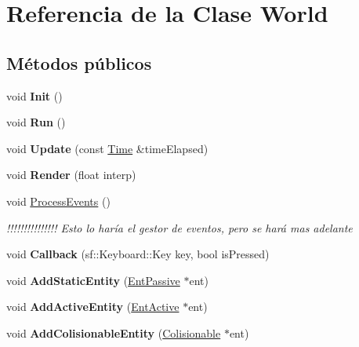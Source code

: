 \hypertarget{classWorld}{\section{Referencia de la Clase World}
\label{classWorld}
}
\subsection*{Métodos públicos}
\begin{DoxyCompactItemize}
\item 
\hypertarget{classWorld_a8f79652f07f99fa41b3db357c4efb895}{void {\bfseries Init} ()}\label{classWorld_a8f79652f07f99fa41b3db357c4efb895}

\item 
\hypertarget{classWorld_acea6eb85cbad062ded1e62193496e9f5}{void {\bfseries Run} ()}\label{classWorld_acea6eb85cbad062ded1e62193496e9f5}

\item 
\hypertarget{classWorld_add9920638985c1c96f2c4616db993ec8}{void {\bfseries Update} (const \hyperlink{classTime}{Time} \&time\-Elapsed)}\label{classWorld_add9920638985c1c96f2c4616db993ec8}

\item 
\hypertarget{classWorld_a4623e37c9b4df02ab156cb185d239df8}{void {\bfseries Render} (float interp)}\label{classWorld_a4623e37c9b4df02ab156cb185d239df8}

\item 
\hypertarget{classWorld_a9b75a4c608052f44f6a712e3d4533169}{void \hyperlink{classWorld_a9b75a4c608052f44f6a712e3d4533169}{Process\-Events} ()}\label{classWorld_a9b75a4c608052f44f6a712e3d4533169}

\begin{DoxyCompactList}\small\item\em !!!!!!!!!!!!!!! Esto lo haría el gestor de eventos, pero se hará mas adelante \end{DoxyCompactList}\item 
\hypertarget{classWorld_a30d86a6a40eef22070409ba0f2c88e70}{void {\bfseries Callback} (sf\-::\-Keyboard\-::\-Key key, bool is\-Pressed)}\label{classWorld_a30d86a6a40eef22070409ba0f2c88e70}

\item 
\hypertarget{classWorld_a110e10c5169c9edeabc1112e1e6e1a77}{void {\bfseries Add\-Static\-Entity} (\hyperlink{classEntPassive}{Ent\-Passive} $\ast$ent)}\label{classWorld_a110e10c5169c9edeabc1112e1e6e1a77}

\item 
\hypertarget{classWorld_a2eb1f61d62b1855a5640b5ccc7b61e90}{void {\bfseries Add\-Active\-Entity} (\hyperlink{classEntActive}{Ent\-Active} $\ast$ent)}\label{classWorld_a2eb1f61d62b1855a5640b5ccc7b61e90}

\item 
\hypertarget{classWorld_a7e82762690a692ef7eb3c0792a28b7ec}{void {\bfseries Add\-Colisionable\-Entity} (\hyperlink{classColisionable}{Colisionable} $\ast$ent)}\label{classWorld_a7e82762690a692ef7eb3c0792a28b7ec}

\end{DoxyCompactItemize}
